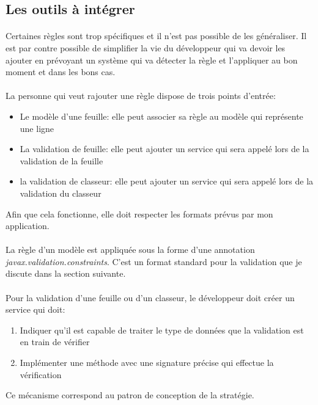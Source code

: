 \subsection{Les outils à intégrer}
\label{subsec:host-tools}

\paragraph{}
Certaines règles sont trop spécifiques et il n'est pas possible de les généraliser.
Il est par contre possible de simplifier la vie du développeur qui va devoir les ajouter en prévoyant un système qui va détecter la règle et l'appliquer au bon moment et dans les bons cas.

\paragraph{}
La personne qui veut rajouter une règle dispose de trois points d'entrée:
\begin{itemize}
    \item Le modèle d'une feuille: elle peut associer sa règle au modèle qui représente une ligne
    \item La validation de feuille: elle peut ajouter un service qui sera appelé lors de la validation de la feuille
    \item la validation de classeur: elle peut ajouter un service qui sera appelé lors de la validation du classeur
\end{itemize}
Afin que cela fonctionne, elle doit respecter les formats prévus par mon application.

\paragraph{}
La règle d'un modèle est appliquée sous la forme d'une annotation \textit{javax.validation.constraints}.
C'est un format standard pour la validation que je discute dans la section suivante.

\paragraph{}
Pour la validation d'une feuille ou d'un classeur, le développeur doit créer un service qui doit:
\begin{enumerate}
    \item Indiquer qu'il est capable de traiter le type de données que la validation est en train de vérifier
    \item Implémenter une méthode avec une signature précise qui effectue la vérification
\end{enumerate}
Ce mécanisme correspond au patron de conception de la stratégie.
